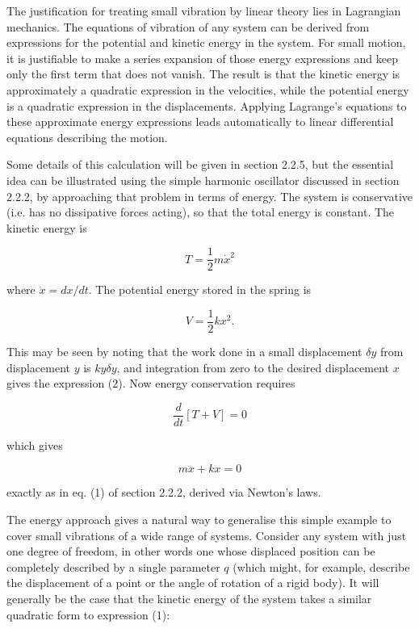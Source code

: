   The justification for treating small vibration by linear theory lies in 
  Lagrangian mechanics. The equations of vibration of any system can be derived 
  from expressions for the potential and kinetic energy in the system. For 
  small motion, it is justifiable to make a series expansion of those energy 
  expressions and keep only the first term that does not vanish. The result is 
  that the kinetic energy is approximately a quadratic expression in the 
  velocities, while the potential energy is a quadratic expression in the 
  displacements. Applying Lagrange's equations to these approximate energy 
  expressions leads automatically to linear differential equations describing 
  the motion. 

  Some details of this calculation will be given in section 2.2.5, but the 
  essential idea can be illustrated using the simple harmonic oscillator 
  discussed in section 2.2.2, by approaching that problem in terms of energy. 
  The system is conservative (i.e. has no dissipative forces acting), so that 
  the total energy is constant. The kinetic energy is 

  \begin{equation*}T=\frac{1}{2} m \dot{x}^2 \tag{1}\end{equation*} 

  \noindent{}where $\dot{x}=dx/dt$. The potential energy stored in the spring 
  is 

  \begin{equation*}V=\frac{1}{2} k x^2. \tag{2}\end{equation*} 

  This may be seen by noting that the work done in a small displacement $\delta 
  y$ from displacement $y$ is $ky\delta y$, and integration from zero to the 
  desired displacement $x$ gives the expression (2). Now energy conservation 
  requires 

  \begin{equation*}\dfrac{d}{dt} [T+V]=0 \tag{3} \end{equation*} 

  \noindent{}which gives 

  \begin{equation*}m \ddot{x} +kx=0 \tag{4}\end{equation*} 

  \noindent{}exactly as in eq. (1) of section 2.2.2, derived via Newton's laws. 

  The energy approach gives a natural way to generalise this simple example to 
  cover small vibrations of a wide range of systems. Consider any system with 
  just one degree of freedom, in other words one whose displaced position can 
  be completely described by a single parameter $q$ (which might, for example, 
  describe the displacement of a point or the angle of rotation of a rigid 
  body). It will generally be the case that the kinetic energy of the system 
  takes a similar quadratic form to expression (1): 

